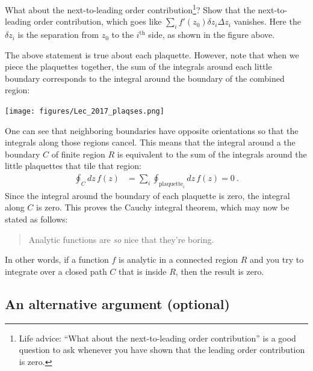\begin{exercise}
What about the next-to-leading order contribution\footnote{Life advice: ``What about the next-to-leading order contribution'' is a good question to ask whenever you have shown that the leading order contribution is zero.}? Show that the next-to-leading order contribution, which goes like $\sum_i f'(z_0)\delta z_i \Delta z_i$ vanishes. Here the $\delta z_i$ is the separation from $z_0$ to the $i^\text{th}$ side, as shown in the figure above. 
\end{exercise}
The above statement is true about each plaquette. However, note that when we piece the plaquettes together, the sum of the integrals around each little boundary corresponds to the integral around the boundary of the combined region:
\begin{center}
\texttt{[image: figures/Lec\_2017\_plaqses.png]}
\end{center}
One can see that neighboring boundaries have opposite orientations so that the integrals along those regions cancel. 
%
This means that the integral around a the boundary $C$ of finite region $R$ is equivalent to the sum of the integrals around the little plaquettes that tile that region:
\begin{align}
	\oint_C dz\, f(z) &= \sum_i \oint_{\text{plaquette}_i} dz\, f(z) = 0 \ .
\end{align}
Since the integral around the boundary of each plaquette is zero, the integral along $C$ is zero. This proves the Cauchy integral theorem, which may now be stated as follows:
\begin{quote}
Analytic functions are \emph{so} nice that they're boring.
\end{quote}
In other words, if a function $f$ is analytic in a connected region $R$ and you try to integrate over a closed path $C$ that is inside $R$, then the result is zero. 

\subsection{An alternative argument (optional)}
\label{sec:stokes:theorem:aside}

